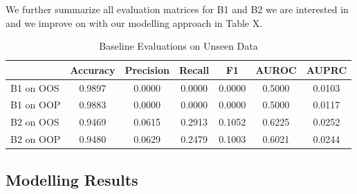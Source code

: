 \documentclass[12pt,titlepage]{article}
\begin{document}
We further summarize all evaluation matrices for B1 and B2 we are interested in and we improve on with our modelling approach in Table X. \\

\begin{table}
    \centering
    \caption{Baseline Evaluations on Unseen Data}
    \begin{tabular}{|l|cccccc|}
    \hline
              & Accuracy & Precision & Recall &   F1   & AUROC & AUPRC  \\
    \hline
    B1 on OOS &  0.9897  &   0.0000  & 0.0000 & 0.0000 & 0.5000 & 0.0103 \\
    B1 on OOP &  0.9883  &   0.0000  & 0.0000 & 0.0000 & 0.5000 & 0.0117 \\
    \hline
    B2 on OOS &  0.9469  &   0.0615  & 0.2913 & 0.1052 & 0.6225 & 0.0252 \\
    B2 on OOP &  0.9480  &   0.0629  & 0.2479 & 0.1003 & 0.6021 & 0.0244 \\
    \hline
    \end{tabular}
\end{table}

\subsection{Modelling Results} \par
\end{document}
